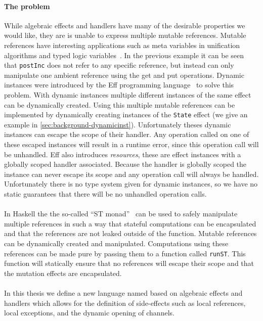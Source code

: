 \paragraph{The problem}
While algebraic effects and handlers have many of the desirable properties we would like, they are is unable to express multiple mutable references.
Mutable references have interesting applications such as meta variables in unification algorithms and typed logic variables~\autocite{typedlogic}.
In the previous example it can be seen that \texttt{postInc} does not refer to any specific reference, but instead can only manipulate one ambient reference using the get and put operations.
Dynamic instances were introduced by the Eff programming language~\autocite{eff1} to solve this problem.
With dynamic instances multiple different instances of the same effect can be dynamically created.
Using this multiple mutable references can be implemented by dynamically creating instances of the \texttt{State} effect (we give an example in \cref{sec:background-dynamicinst}).
Unfortunately theses dynamic instances can escape the scope of their handler.
Any operation called on one of these escaped instances will result in a runtime error, since this operation call will be unhandled.
Eff also introduces \emph{resources}, these are effect instances with a globally scoped handler associated.
Because the handler is globally scoped the instance can never escape its scope and any operation call will always be handled.
Unfortunately there is no type system given for dynamic instances, so we have no static guarantees that there will be no unhandled operation calls.
\\\\
In Haskell the the so-called ``ST monad''~\autocite{runst} can be used to safely manipulate multiple references in such a way that stateful computations can be encapsulated and that the references are not leaked outside of the function.
Mutable references can be dynamically created and manipulated.
Computations using these references can be made pure by passing them to a function called \texttt{runST}.
This function will statically ensure that no references will escape their scope and that the mutation effects are encapsulated.
\\\\
In this thesis we define a new language named \lang{} based on algebraic effects and handlers which allows for the definition of side-effects such as local references, local exceptions, and the dynamic opening of channels.

